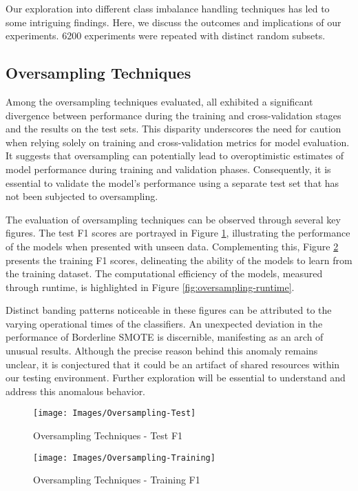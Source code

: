 \documentclass[journal]{IEEEtran}
\begin{document}
	Our exploration into different class imbalance handling techniques has led to some intriguing findings. Here, we discuss the outcomes and implications of our experiments. 6200 experiments were repeated with distinct random subsets.
	
	\subsection{Oversampling Techniques}
	
	Among the oversampling techniques evaluated, all exhibited a significant divergence between performance during the training and cross-validation stages and the results on the test sets. This disparity underscores the need for caution when relying solely on training and cross-validation metrics for model evaluation. It suggests that oversampling can potentially lead to overoptimistic estimates of model performance during training and validation phases. Consequently, it is essential to validate the model's performance using a separate test set that has not been subjected to oversampling.
	
	The evaluation of oversampling techniques can be observed through several key figures. The test F1 scores are portrayed in Figure \ref{fig:oversampling-test}, illustrating the performance of the models when presented with unseen data. Complementing this, Figure \ref{fig:oversampling-training} presents the training F1 scores, delineating the ability of the models to learn from the training dataset. The computational efficiency of the models, measured through runtime, is highlighted in Figure \ref{fig:oversampling-runtime}.
	
	Distinct banding patterns noticeable in these figures can be attributed to the varying operational times of the classifiers. An unexpected deviation in the performance of Borderline SMOTE is discernible, manifesting as an arch of unusual results. Although the precise reason behind this anomaly remains unclear, it is conjectured that it could be an artifact of shared resources within our testing environment. Further exploration will be essential to understand and address this anomalous behavior.
	
\begin{figure}
	\centering
	\texttt{[image: Images/Oversampling-Test]}
	\caption{Oversampling Techniques - Test F1}
	\label{fig:oversampling-test}
\end{figure}
	
\begin{figure}
	\centering
	\texttt{[image: Images/Oversampling-Training]}
	\caption{Oversampling Techniques - Training F1}
	\label{fig:oversampling-training}
\end{figure}
\end{document}
